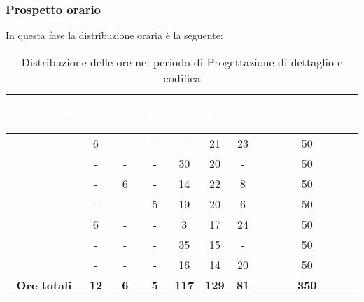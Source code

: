 \subsubsection{Prospetto orario}
In questa fase la distribuzione oraria è la seguente:
\begin{table}[H]
	\begin{center}
		\begin{tabular}{ c c c c c c c c }
		\rowcolor{darkblue} 
		\textcolor{white}{\textbf{Nominativo}} & \textcolor{white}{\textbf{Re}} & \textcolor{white}{\textbf{Am}} & \textcolor{white}{\textbf{An}} & \textcolor{white}{\textbf{Pt}} & \textcolor{white}{\textbf{Pr}} & \textcolor{white}{\textbf{Ve}} & \textcolor{white}{\textbf{Ore Complessive}} \\ \hline
		\BL & 6  & -  & - & - & 21 & 23 & 50 \\ \hline
		\FF & -  & -  & - & 30 & 20 & -  & 50 \\ \hline
		\MM & -  & 6  & - & 14 & 22 & 8 & 50 \\ \hline
		\PC & - & -  & 5 & 19 & 20 & 6 & 50 \\ \hline
		\TG & 6  & - & - & 3 & 17 & 24 & 50 \\ \hline
		\TL & -  & - & - & 35 & 15 & - & 50 \\ \hline
		\VD & -  & -  & - & 16 & 14 & 20 & 50 \\ \hline
		\textbf{Ore totali} & \textbf{12} & \textbf{6} & \textbf{5} & \textbf{117} & \textbf{129} & \textbf{81} & \textbf{350} \\ \hline
		\end{tabular}
	\caption{Distribuzione delle ore nel periodo di Progettazione di dettaglio e codifica}
	\end{center}
\end{table}

